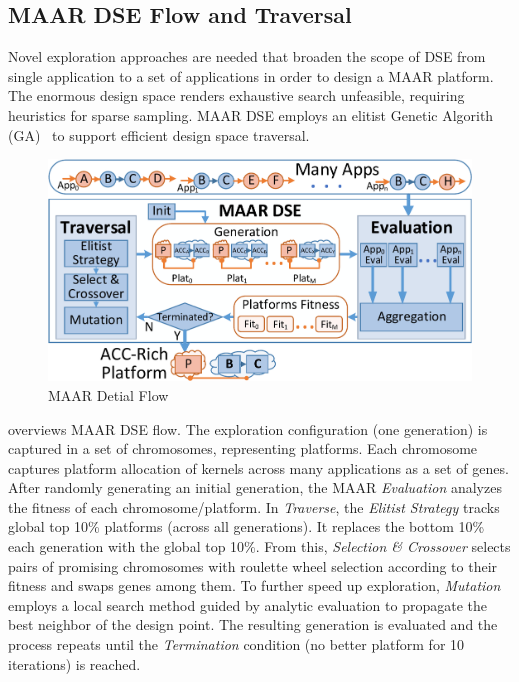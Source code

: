 \newcommand{\dsename}[1]{\textit{#1}}

\vspace{-2pt}
\subsection{MAAR DSE Flow and Traversal}
\label{subsec:MAAR}

Novel exploration approaches are needed that broaden the scope of DSE from single application to a set of applications in order to design a MAAR platform. The enormous design space renders exhaustive search unfeasible, requiring heuristics for sparse sampling. MAAR DSE employs an elitist Genetic Algorith (GA)~\cite{quan2014towards} to support efficient design space traversal.

\begin{figure}[h]
	\centering
	\includegraphics[width=.9\linewidth]{fig/MAARflowDetial.pdf}
	\vspace{-4pt}
	\caption{MAAR Detial Flow}
	\label{fig:MAARflowDetial}
\end{figure}

 overviews MAAR DSE flow. The exploration configuration (one generation) is captured in a set of chromosomes, representing platforms. Each chromosome captures platform allocation of kernels across many applications as a set of genes. After randomly generating an initial generation, the MAAR \dsename{Evaluation} analyzes the fitness of each chromosome/platform. In \dsename{Traverse}, the \dsename{Elitist Strategy} tracks global top 10\% platforms (across all generations). It replaces the bottom 10\% each generation with the global top 10\%. From this, \dsename{Selection \& Crossover} selects pairs of promising chromosomes with roulette wheel selection according to their fitness and swaps genes among them. To further speed up exploration, \dsename{Mutation} employs a local search method guided by analytic evaluation to propagate the best neighbor of the design point. The resulting generation is evaluated and the process repeats until the \dsename{Termination} condition (no better platform for 10 iterations) is reached.